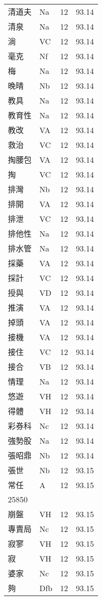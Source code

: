 \documentclass[twocolumn]{book}
\begin{document}
\begin{supertabular}{llrr}
清道夫 & Na & 12 &  93.14\\
清泉 & Na & 12 &  93.14\\
淌 & VC & 12 &  93.14\\
毫克 & Nf & 12 &  93.14\\
梅 & Na & 12 &  93.14\\
晚晴 & Nb & 12 &  93.14\\
教具 & Na & 12 &  93.14\\
教育性 & Na & 12 &  93.14\\
教改 & VA & 12 &  93.14\\
救治 & VC & 12 &  93.14\\
掏腰包 & VA & 12 &  93.14\\
掏 & VC & 12 &  93.14\\
排灣 & Nb & 12 &  93.14\\
排開 & VA & 12 &  93.14\\
排泄 & VC & 12 &  93.14\\
排他性 & Na & 12 &  93.14\\
排水管 & Na & 12 &  93.14\\
採藥 & VA & 12 &  93.14\\
採計 & VC & 12 &  93.14\\
授與 & VD & 12 &  93.14\\
推演 & VA & 12 &  93.14\\
掉頭 & VA & 12 &  93.14\\
接機 & VA & 12 &  93.14\\
接住 & VC & 12 &  93.14\\
接合 & VB & 12 &  93.14\\
情理 & Na & 12 &  93.14\\
悠遊 & VH & 12 &  93.14\\
得體 & VH & 12 &  93.14\\
彩券科 & Nc & 12 &  93.14\\
強勢股 & Na & 12 &  93.14\\
張昭鼎 & Nb & 12 &  93.14\\
張世 & Nb & 12 &  93.15\\
常任 & A & 12 &  93.15\\
25850\\
崩盤 & VH & 12 &  93.15\\
專賣局 & Nc & 12 &  93.15\\
寂寥 & VH & 12 &  93.15\\
寂 & VH & 12 &  93.15\\
婆家 & Nc & 12 &  93.15\\
夠 & Dfb & 12 &  93.15\\

\end{supertabular}
\end{document}
